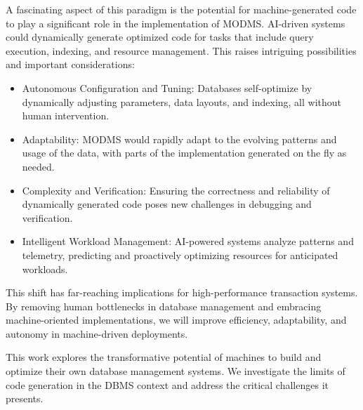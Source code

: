 \documentclass[acmsmall, nonacm]{acmart}
\begin{document}
A fascinating aspect of this paradigm is the potential for machine-generated code to play a significant role in the implementation of MODMS. AI-driven systems could dynamically generate optimized code for tasks that include query execution, indexing, and resource management. This raises intriguing possibilities and important considerations:

\begin{itemize}
    \item Autonomous Configuration and Tuning: Databases self-optimize by dynamically adjusting parameters, data layouts, and indexing, all without human intervention.
    \item Adaptability: MODMS would rapidly adapt to the evolving patterns and usage of the data, with parts of the implementation generated on the fly as needed.
    \item Complexity and Verification: Ensuring the correctness and reliability of dynamically generated code poses new challenges in debugging and verification.
    \item Intelligent Workload Management: AI-powered systems analyze patterns and telemetry, predicting and proactively optimizing resources for anticipated workloads.
\end{itemize}

This shift has far-reaching implications for high-performance transaction systems. By removing human bottlenecks in database management and embracing machine-oriented implementations, we will improve efficiency, adaptability, and autonomy in machine-driven deployments.

This work explores the transformative potential of machines to build and optimize their own database management systems. We investigate the limits of code generation in the DBMS context and address the critical challenges it presents.
\end{document}
